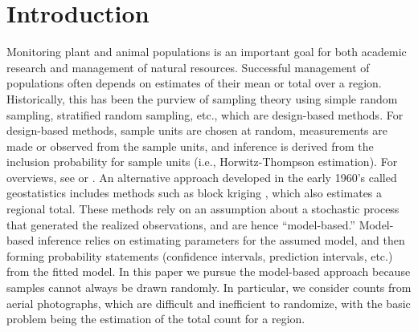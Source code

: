 \documentclass[12pt, titlepage]{article}\usepackage[]{graphicx}\usepackage[]{color}
\begin{document}

\newpage
\section{Introduction}

Monitoring plant and animal populations is an important goal for both academic research and management of natural resources. Successful management of populations often depends on estimates of their mean or total over a region. Historically, this has been the purview of sampling theory using simple random sampling, stratified random sampling, etc., which are design-based methods.  For design-based methods, sample units are chosen at random, measurements are made or observed from the sample units, and inference is derived from the inclusion probability for sample units (i.e., Horwitz-Thompson estimation).  For overviews, see \citet{Coch:samp:1977} or \citet{Thom:samp:1992}. An alternative approach developed in the early 1960's called geostatistics includes methods such as block kriging \citep{Gand:prob:1959, Gand:opti:1960, Math:Prin:1963}, which also estimates a regional total.  These methods rely on an assumption about a stochastic process that generated the realized observations, and are hence ``model-based.''  Model-based inference relies on estimating parameters for the assumed model, and then forming probability statements (confidence intervals, prediction intervals, etc.) from the fitted model.  In this paper we pursue the model-based approach because samples cannot always be drawn randomly. In particular, we consider counts from aerial photographs, which are difficult and inefficient to randomize, with the basic problem being the estimation of the total count for a region.  
\end{document}
